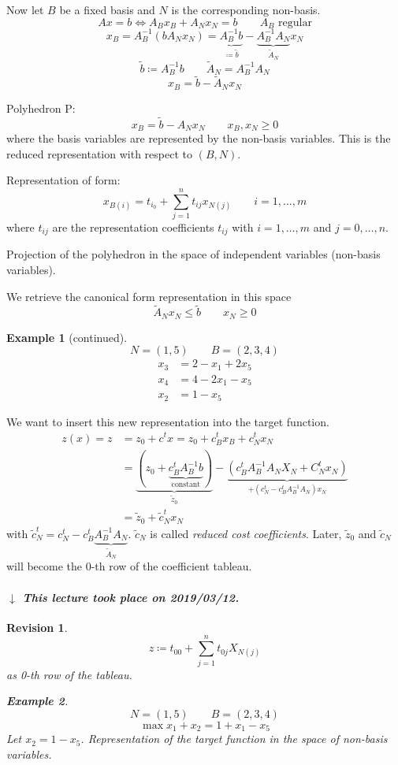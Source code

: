 \documentclass[a4paper]{article}
\numberwithin{lecref}{subsection}
\newtheorem*{Example}{Example}
\newtheorem*{Revision}{Revision}
\newcommand{\dateref}[1]{%
  \begin{mdframed}[backgroundcolor=gray!10,innerbottommargin=0pt,innertopmargin=0pt]
    \paragraph{\textit{$\downarrow$ This lecture took place on #1.}}%
  \end{mdframed}%
}
\begin{document}
Now let $B$ be a fixed basis and $N$ is the corresponding non-basis.
\[ Ax = b \iff A_B x_B + A_N x_N = b \qquad A_B \text{ regular} \]
\[ x_B = A_B^{-1} (b  A_N x_N) = \underbrace{A_B^{-1} b}_{\coloneqq \tilde b} - \underbrace{A_B^{-1} A_N}_{\tilde A_N} x_N \]
\[ \tilde b \coloneqq A_B^{-1} b \qquad \tilde A_N = A_B^{-1} A_N \]
\[ x_B = \tilde b - \tilde A_N x_N \]

Polyhedron P:
\[ x_B = \tilde b - A_N x_N \qquad x_B, x_N \geq 0 \]
where the basis variables are represented by the non-basis variables.
This is the reduced representation with respect to $(B, N)$.

Representation of form:
\[ x_{B(i)} = t_{i_0} + \sum_{j=1}^n t_{ij} x_{N(j)} \qquad i = 1, \dots, m \]
where $t_{ij}$ are the representation coefficients $t_{ij}$ with $i = 1, \dots, m$ and $j = 0, \dots, n$.

Projection of the polyhedron in the space of independent variables (non-basis variables).

We retrieve the canonical form representation in this space
\[ \tilde A_N x_N \leq \tilde b \qquad x_N \geq 0 \]

\begin{Example}[continued]
	\[ N = (1, 5) \qquad B = (2, 3, 4) \]
	\begin{align*}
		x_3 &= 2 - x_1 + 2 x_5 \\
		x_4 &= 4 - 2x_1 - x_5 \\
		x_2 &= 1 - x_5
	\end{align*}
\end{Example}

We want to insert this new representation into the target function.
\begin{align*}
	z(x) = z
		&= z_0 + c^t x = z_0 + c_B^t x_B + c_N^t x_N \\
		&= \underbrace{(z_0 + \underbrace{c_B^t A_B^{-1} b}_{\text{constant}})}_{\tilde z_0} - \underbrace{(c_B^t A_B^{-1} A_N X_N + C_N^t x_N)}_{+ (c_N^t - c_B^t A_B^{-1} A_N) x_N} \\
		&= \tilde z_0 + \tilde c_N^t x_N
\end{align*}
with $\tilde c_N^t = c_N^t - c_B^t \underbrace{A_B^{-1} A_N}_{\tilde A_N}$. $\tilde c_N$ is called \emph{reduced cost coefficients}. Later, $\tilde z_0$ and $\tilde c_N$ will become the 0-th row of the coefficient tableau.

\dateref{2019/03/12}

\begin{Revision}
	\[ z \coloneqq t_{00} + \sum_{j=1}^n t_{0j} X_{N(j)} \]
	as 0-th row of the tableau.
	\begin{Example}
		\[ N = (1, 5) \qquad B = (2, 3, 4) \]
		\[ \max x_1 + x_2 = 1 + x_1 - x_5 \]
		Let $x_2 = 1 - x_5$.
		Representation of the target function in the space of non-basis variables.
	\end{Example}
\end{Revision}
\end{document}

